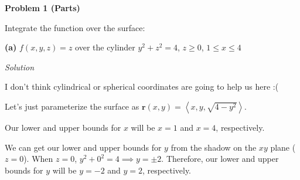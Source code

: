 \documentclass{article}
\newcommand{\lra}[1]{\left\langle #1 \right\rangle}
\renewcommand{\r}[0]{\mathbf{r}}
\newcommand{\Solution}{\textit{Solution}}
\begin{document}
{}\textbf{Problem 1 (Parts)}

Integrate the function over the surface:

{}\textbf{(a)} $f(x,y,z)=z$ over the cylinder $y^2+z^2=4$, $z\geq 0$, $1\leq x\leq 4$

\Solution

I don't think cylindrical or spherical coordinates are going to help us here :(

Let's just parameterize the surface as $\r(x,y)=\lra{x,y,\sqrt{4-y^2}}$. 

Our lower and upper bounds for $x$ will be $x=1$ and $x=4$, respectively.

We can get our lower and upper bounds for $y$ from the shadow on the $xy$ plane ($z=0$). When $z=0$, $y^2+0^2=4\implies y=\pm 2$. Therefore, our lower and upper bounds for $y$ will be $y=-2$ and $y=2$, respectively.
\end{document}
